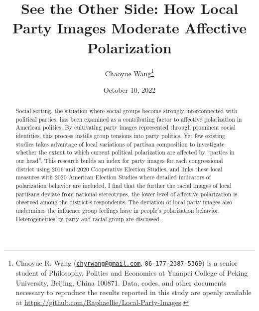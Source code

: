 \documentclass[
  12pt,
]{article}
\title{See the Other Side: How Local Party Images Moderate Affective
Polarization}
\author{Chaoyue Wang\footnote{Chaoyue R. Wang
  (\href{mailto:chyrwang@gmail.com}{\nolinkurl{chyrwang@gmail.com}},
  \texttt{86-177-2387-5369}) is a senior student of Philosophy, Politics
  and Economics at Yuanpei College of Peking University, Beijing, China
  100871. Data, codes, and other documents necessary to reproduce the
  results reported in this study are openly available at
  \url{https://github.com/Raphaellie/Local-Party-Images}.}}
\date{October 10, 2022}
\begin{document}

\maketitle


\thispagestyle{empty}

\begin{abstract}  \onehalfspacing
\begin{normalsize}  \noindent 
Social sorting, the situation where social groups become strongly
interconnected with political parties, has been examined as a
contributing factor to affective polarization in American politics. By
cultivating party images represented through prominent social
identities, this process instills group tensions into party politics.
Yet few existing studies takes advantage of local variations of partisan
composition to investigate whether the extent to which current political
polarization are affected by ``parties in our head''. This research
builds an index for party images for each congressional district using
2016 and 2020 Cooperative Election Studies, and links these local
measures with 2020 American Election Studies where detailed indicators
of polarization behavior are included. I find that the further the
racial images of local partisans deviate from national stereotypes, the
lower level of affective polarization is observed among the district's
respondents. The deviation of local party images also undermines the
influence group feelings have in people's polarization behavior.
Heterogeneities by party and racial group are discussed.
\end{normalsize}
\end{abstract}

\begin{quote}
\end{quote}

\newpage \clearpage {}\captionsetup{labelfont = bf, font = small}



\end{document}
